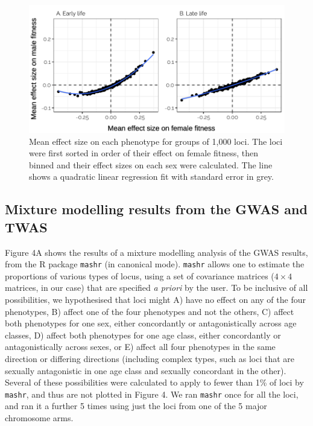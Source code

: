\documentclass{article}
\begin{document}
\begin{figure}[h]
\centering
\includegraphics[width=1.0\textwidth]{../figures/boyle_plot.pdf}
\caption{\footnotesize{Mean effect size on each phenotype for groups of 1,000 loci. The loci were first sorted in order of their effect on female fitness, then binned and their effect sizes on each sex were calculated. The line shows a quadratic linear regression fit with standard error in grey.}}
\end{figure}
\newpage

\subsection*{Mixture modelling results from the GWAS and TWAS}

Figure 4A shows the results of a mixture modelling analysis of the GWAS
results, from the R package \texttt{mashr} (in canonical mode).
\texttt{mashr} allows one to estimate the proportions of various types
of locus, using a set of covariance matrices (\(4\times4\) matrices, in
our case) that are specified \emph{a priori} by the user. To be
inclusive of all possibilities, we hypothesised that loci might A) have
no effect on any of the four phenotypes, B) affect one of the four
phenotypes and not the others, C) affect both phenotypes for one sex,
either concordantly or antagonistically across age classes, D) affect
both phenotypes for one age class, either concordantly or
antagonistically across sexes, or E) affect all four phenotypes in the
same direction or differing directions (including complex types, such as
loci that are sexually antagonistic in one age class and sexually
concordant in the other). Several of these possibilities were calculated
to apply to fewer than 1\% of loci by \texttt{mashr}, and thus are not
plotted in Figure 4. We ran \texttt{mashr} once for all the loci, and
ran it a further 5 times using just the loci from one of the 5 major
chromosome arms.
\end{document}
